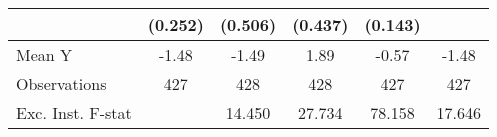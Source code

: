 {\begin{tabular}{l*{5}{c}}
            &     (0.252)         &     (0.506)         &     (0.437)         &     (0.143)         &                     \\
\midrule
Mean Y      &       -1.48         &       -1.49         &        1.89         &       -0.57         &       -1.48         \\
Observations&         427         &         428         &         428         &         427         &         427         \\
Exc. Inst. F-stat&                     &      14.450         &      27.734         &      78.158         &      17.646         \\
\bottomrule
\end{tabular}
}
